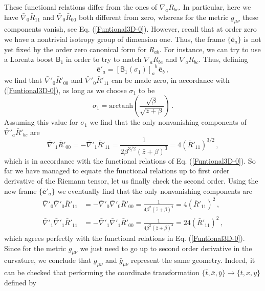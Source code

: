 \documentclass[twocolumn,prd,aps,showpacs,showkeys,amsmath,amssymb]{revtex4-1}
\newcommand{\bl}{\boldsymbol}
\begin{document}
These functional relations differ from the ones of $\nabla_{a}R_{bc}$. In particular, here we have $\bar{\nabla}_{0}\bar{R}_{11}$ and $\bar{\nabla}_{0}\bar{R}_{00}$ both different from zero, whereas for the metric $g_{\mu\nu}$ these components vanish, see Eq. (\ref{Funtional3D-0}). However, recall that at order zero we have a nontrivial isotropy group of dimension one. Thus, the frame $\{ \bar{\bl{e}}_a\}$ is not yet fixed by the order zero canonical form for $R_{ab}$. For instance, we can try to use a Lorentz boost $\textsf{B}_1$ in order to try to match $\bar{\nabla}_{a}\bar{R}_{bc}$ and $\nabla_{a}R_{bc}$. Thus, defining
\begin{equation*}
   \bar{\bl{e}}'_a = [\textsf{B}_1(\sigma_1) ]_a^{\;\;b}\, \bar{\bl{e}}_b\,,
\end{equation*}
we find that $\bar{\nabla}'_{0}\bar{R}'_{00}$ and $\bar{\nabla}'_{0}\bar{R}'_{11}$ can be made zero, in accordance with (\ref{Funtional3D-0}), as long as we choose $\sigma_1$ to be
\begin{equation*}
  \sigma_1 = \textrm{arctanh}\left( \frac{\sqrt{\beta}}{\sqrt{\bar{z} + \beta}}\right) \,.
\end{equation*}
Assuming this value for $\sigma_1$ we find that the only nonvanishing components of $\bar{\nabla}'_{a}\bar{R}'_{bc}$ are
\begin{equation*}
  \bar{\nabla}'_{1}\bar{R}'_{00} =   - \bar{\nabla}'_{1}\bar{R}'_{11}  =
  \frac{1}{2\beta^{3/2} (\bar{z}+\beta)^3} = 4 (\bar{R}'_{11})^{3/2}\,,
\end{equation*}
which is in accordance with the functional relations of Eq. (\ref{Funtional3D-0}). So far we have managed to equate the functional relations up to first order derivative of the Riemann tensor, let us finally check the second order. Using the new frame $\{\bar{\bl{e}}'_a\}$ we eventually find that the only nonvanishing components are
\begin{align*}
\bar{\nabla}'_{0} \bar{\nabla}'_{0} \bar{R}'_{11} &=
 - \bar{\nabla}'_{0} \bar{\nabla}'_{0} \bar{R}'_{00}   =
 \frac{1}{4\beta^2 (\bar{z}+\beta)^4} = 4 (\bar{R}'_{11})^2 \,,\\
 \bar{\nabla}'_{1} \bar{\nabla}'_{1} \bar{R}'_{11} &=
 - \bar{\nabla}'_{1} \bar{\nabla}'_{1} \bar{R}'_{00}   =
 \frac{1}{4\beta^2 (\bar{z}+\beta)^4} = 24 (\bar{R}'_{11})^2 \,,
\end{align*}
which agrees perfectly with the functional relations in Eq. (\ref{Funtional3D-0}). Since for the metric $g_{\mu\nu}$ we just need to go up to second order derivative in the curvature, we conclude that $g_{\mu\nu}$ and $\bar{g}_{\mu\nu}$ represent the same geometry. Indeed, it can be checked that performing the coordinate transformation $\{\bar{t},\bar{x},\bar{y}\}\rightarrow \{t,x,y\}$ defined by
\end{document}

